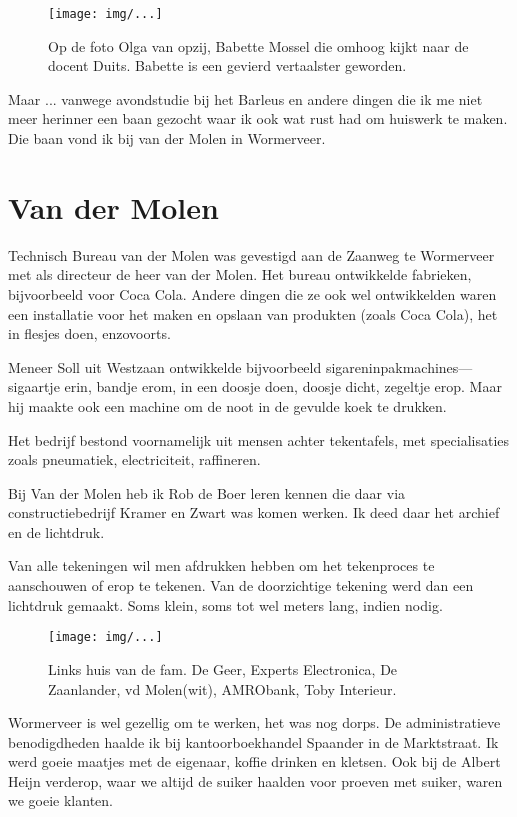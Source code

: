 \documentclass[10pt,twoside,openright]{memoir}
\begin{document}
\begin{figure}[t]
\texttt{[image: img/...]}
\caption{Op de foto Olga van opzij, Babette Mossel die omhoog kijkt naar de docent Duits. Babette is een gevierd vertaalster geworden.}
\end{figure}

Maar ... vanwege avondstudie bij het Barleus en andere dingen die ik me niet meer herinner een baan gezocht waar ik ook wat rust had om huiswerk te maken. Die baan vond ik bij van der Molen in Wormerveer.

\chapter{Van der Molen} %
\label{cha:vandermolen}

Technisch Bureau van der Molen was gevestigd aan de Zaanweg te Wormerveer met als directeur de heer van der Molen. Het bureau ontwikkelde fabrieken, bijvoorbeeld voor Coca Cola. Andere dingen die ze ook wel ontwikkelden waren een installatie voor het maken en opslaan van produkten (zoals Coca Cola), het in flesjes doen, enzovoorts. 

Meneer Soll uit Westzaan ontwikkelde bijvoorbeeld sigareninpakmachines---sigaartje erin, bandje erom, in een doosje doen, doosje dicht, zegeltje erop. Maar hij maakte ook een machine om de noot in de gevulde koek te drukken. 

Het bedrijf bestond voornamelijk uit mensen achter tekentafels, met specialisaties zoals pneumatiek, electriciteit, raffineren.

Bij Van der Molen heb ik Rob de Boer leren kennen die daar via constructiebedrijf Kramer en Zwart was komen werken. Ik deed daar het archief en de lichtdruk. 

Van alle tekeningen wil men afdrukken hebben om het tekenproces te aanschouwen of erop te tekenen. Van de doorzichtige tekening werd dan een lichtdruk gemaakt. Soms klein, soms tot wel meters lang, indien nodig. 

\begin{figure}[t]
\texttt{[image: img/...]}
\caption{Links huis van de fam. De Geer, Experts Electronica, De Zaanlander, vd Molen(wit), AMRObank, Toby Interieur.}
\end{figure}

Wormerveer is wel gezellig om te werken, het was nog dorps. De administratieve benodigdheden haalde ik bij kantoorboekhandel Spaander in de Marktstraat. Ik werd goeie maatjes met de eigenaar, koffie drinken en kletsen. Ook bij de Albert Heijn verderop, waar we altijd de suiker haalden voor proeven met suiker, waren we goeie klanten. 
\end{document}
